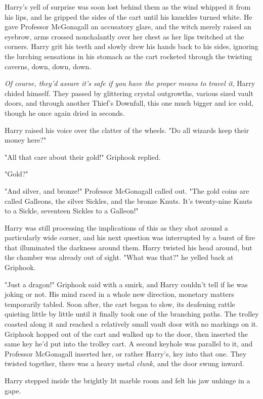 Harry's yell of surprise was soon lost behind them as the
wind whipped it from his lips, and he gripped the sides of
the cart until his knuckles turned white. He gave Professor
McGonagall an accusatory glare, and the witch merely
raised an eyebrow, arms crossed nonchalantly over her
chest as her lips twitched at the corners. Harry grit his
teeth and slowly drew his hands back to his sides, ignoring
the lurching sensations in his stomach as the cart rocketed
through the twisting caverns, down, down, down.

\emph{Of course, they'd assure it's safe if you have the proper
means to travel it}, Harry chided himself. They passed by
glittering crystal outgrowths, various sized vault doors, and
through another Thief's Downfall, this one much bigger and
ice cold, though he once again dried in seconds.

Harry raised his voice over the clatter of the wheels. "Do
all wizards keep their money here?"

"All that care about their gold!" Griphook replied.

"Gold?"

"And silver, and bronze!" Professor McGonagall called out.
"The gold coins are called Galleons, the silver Sickles, and
the bronze Knuts. It's twenty-nine Knuts to a Sickle,
seventeen Sickles to a Galleon!"

Harry was still processing the implications of this as they
shot around a particularly wide corner, and his next
question was interrupted by a burst of fire that illuminated
the darkness around them. Harry twisted his head around,
but the chamber was already out of sight. "What was
that?" he yelled back at Griphook.

"Just a dragon!" Griphook said with a smirk, and Harry
couldn't tell if he was joking or not. His mind raced in a
whole new direction, monetary matters temporarily tabled.
Soon after, the cart began to slow, its deafening rattle
quieting little by little until it finally took one of the
branching paths. The trolley coasted along it and reached a
relatively small vault door with no markings on it. Griphook
hopped out of the cart and walked up to the door, then
inserted the same key he'd put into the trolley cart. A
second keyhole was parallel to it, and Professor McGonagall
inserted her, or rather Harry's, key into that one. They
twisted together, there was a heavy metal \emph{clunk,} and the
door swung inward.

Harry stepped inside the brightly lit marble room and felt
his jaw unhinge in a gape.

